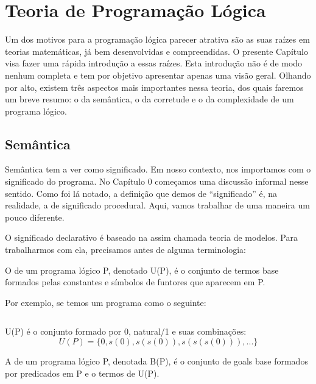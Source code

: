 \documentclass{article}
\begin{document}
\section{Teoria de Programação Lógica}

Um dos motivos para a programação lógica parecer atrativa são as suas raízes em teorias matemáticas, já bem desenvolvidas e compreendidas. O presente Capítulo visa fazer uma rápida introdução a essas raízes. Esta introdução não é de modo nenhum completa e tem por objetivo apresentar apenas uma visão geral. Olhando por alto, existem três aspectos mais importantes nessa teoria, dos quais faremos um breve resumo: o da semântica, o da corretude e o da complexidade de um programa lógico.

\subsection{Semântica}
Semântica tem a ver como significado. Em nosso contexto, nos importamos com o significado do programa. No Capítulo 0 %
começamos uma discussão informal nesse sentido. Como foi lá notado, a definição que demos de ``significado'' é, na realidade, a de significado procedural. Aqui, vamos trabalhar de uma maneira um pouco diferente.

O significado declarativo é baseado na assim chamada teoria de modelos. Para trabalharmos com ela, precisamos antes de alguma terminologia:

\begin{definition} O  de um programa lógico P, denotado U(P), é o conjunto de termos base formados pelas constantes e símbolos de funtores que aparecem em P.
\end{definition}

Por exemplo, se temos um programa como o seguinte:

%
\inputminted{prolog}{../Exemplos/Cap2/prog1_natural.pl}\label{lst:natural}

U(P) é o conjunto formado por 0, natural/1 e suas combinações:
\[
  U(P) = \{0, s(0), s(s(0)), s(s(s(0))), ...\}
\]

\begin{definition} A  de um programa lógico P, denotada B(P), é o conjunto de goals base formados por predicados em P e o termos de U(P).
\end{definition}
\end{document}

